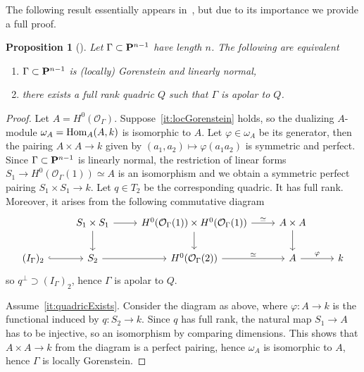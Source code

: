\documentclass{amsart}
\newcommand{\Hom}{{\rm{Hom}}}
\newcommand{\PP}{{\bf P}}
\newcommand{\OO}{{\mathcal{O}}}
\newtheorem{proposition}[lemma]{\bf Proposition}
\begin{document}
The following result essentially appears in~\cite{RS}, but due to its
importance we provide a full proof.
\begin{proposition}[{\cite[Lemma~2.6]{RS}}]\label{ref:charOfPossiblyApolar:prop}
    Let $\Gamma \subset \PP^{n-1}$ have length $n$. The following are
    equivalent
    \begin{enumerate}
        \item\label{it:locGorenstein} $\Gamma\subset \PP^{n-1}$ is (locally) Gorenstein and linearly normal,
        \item\label{it:quadricExists} there exists a full rank quadric $Q$ such that $\Gamma$ is
            apolar to $Q$.
    \end{enumerate}
\end{proposition}

\begin{proof}
    Let $A = H^0(\OO_{\Gamma})$.
    Suppose~\ref{it:locGorenstein} holds, so the dualizing $A$-module $\omega_A
    = \Hom_A(A, k)$ is isomorphic to $A$. Let $\varphi\in \omega_A$ be its generator,
    then the pairing $A\times A\to k$ given by $(a_1, a_2)\mapsto
    \varphi(a_1a_2)$ is symmetric and perfect. Since $\Gamma\subset \PP^{n-1}$ is linearly
    normal, the restriction of linear forms $S_1\to H^0(\OO_{\Gamma}(1))
    \simeq A$ is an isomorphism and we obtain a symmetric perfect pairing $S_1\times
    S_1\to k$. Let $q\in T_2$ be the corresponding quadric. It has full rank.
    Moreover, it arises from the following commutative diagram
    \[
        \begin{tikzcd}
            & S_1 \times S_1 \ar[d]\ar[r] & H^0(\OO_{\Gamma}(1)) \times
            H^0(\OO_{\Gamma}(1)) \ar[d] \ar[r, "\simeq"] & A\times A\ar[d] \\
            (I_{\Gamma})_2 \ar[r, hook] & S_2 \ar[r] & H^0(\OO_{\Gamma}(2)) \ar[r, "\simeq"] & A
            \ar[r, "\varphi"]& k
        \end{tikzcd}
    \]
    so $q^\perp \supset (I_{\Gamma})_2$, hence $\Gamma$ is apolar to
    $Q$.

    Assume~\ref{it:quadricExists}. Consider the diagram as above, where
    $\varphi\colon A\to k$ is the functional induced by $q\colon S_2\to k$.
    Since $q$ has full rank, the natural map $S_1\to A$ has to be injective,
    so an isomorphism by comparing dimensions. This shows that $A \times A\to
    k$ from the diagram is a perfect pairing, hence $\omega_A$ is isomorphic
    to $A$, hence $\Gamma$ is locally Gorenstein.
\end{proof}
\end{document}

